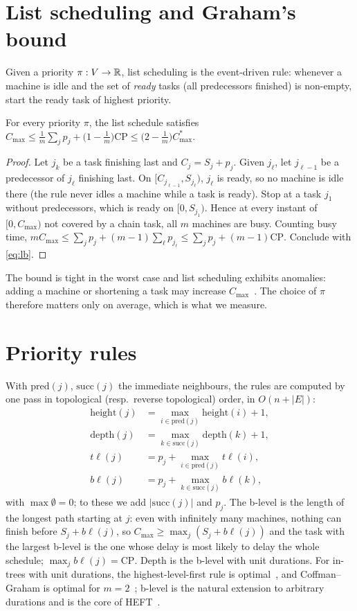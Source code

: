 \documentclass[10pt,twocolumn]{article}
\begin{document}
\section{List scheduling and Graham's bound}
Given a priority $\pi:V\to\mathbb{R}$, list scheduling is the event-driven rule: whenever a machine is idle and the set of \emph{ready} tasks (all predecessors finished) is non-empty, start the ready task of highest priority.
\begin{theorem}
For every priority $\pi$, the list schedule satisfies
$C_{\max}\le\frac1m\sum_jp_j+\big(1-\frac1m\big)\mathrm{CP}\le\big(2-\frac1m\big)C^*_{\max}.$
\end{theorem}
\begin{proof}
Let $j_k$ be a task finishing last and $C_j=S_j+p_j$. Given $j_\ell$, let $j_{\ell-1}$ be a predecessor of $j_\ell$ finishing last. On $[C_{j_{\ell-1}},S_{j_\ell})$, $j_\ell$ is ready, so no machine is idle there (the rule never idles a machine while a task is ready). Stop at a task $j_1$ without predecessors, which is ready on $[0,S_{j_1})$. Hence at every instant of $[0,C_{\max})$ not covered by a chain task, all $m$ machines are busy. Counting busy time, $mC_{\max}\le\sum_jp_j+(m-1)\sum_\ell p_{j_\ell}\le\sum_jp_j+(m-1)\mathrm{CP}$. Conclude with \eqref{eq:lb}.
\end{proof}
The bound is tight in the worst case and list scheduling exhibits anomalies: adding a machine or shortening a task may increase $C_{\max}$~\cite{graham1969}. The choice of $\pi$ therefore matters only on average, which is what we measure.

\section{Priority rules}
With $\mathrm{pred}(j)$, $\mathrm{succ}(j)$ the immediate neighbours, the rules are computed by one pass in topological (resp.\ reverse topological) order, in $O(n+|E|)$:
\begin{align*}
\mathrm{height}(j)&=\textstyle\max_{i\in\mathrm{pred}(j)}\mathrm{height}(i)+1,\\
\mathrm{depth}(j)&=\textstyle\max_{k\in\mathrm{succ}(j)}\mathrm{depth}(k)+1,\\
t\ell(j)&=p_j+\textstyle\max_{i\in\mathrm{pred}(j)}t\ell(i),\\
b\ell(j)&=p_j+\textstyle\max_{k\in\mathrm{succ}(j)}b\ell(k),
\end{align*}
with $\max\emptyset=0$; to these we add $|\mathrm{succ}(j)|$ and $p_j$. The b-level is the length of the longest path starting at $j$: even with infinitely many machines, nothing can finish before $S_j+b\ell(j)$, so $C_{\max}\ge\max_j(S_j+b\ell(j))$ and the task with the largest b-level is the one whose delay is most likely to delay the whole schedule; $\max_jb\ell(j)=\mathrm{CP}$. Depth is the b-level with unit durations. For in-trees with unit durations, the highest-level-first rule is optimal~\cite{hu1961}, and Coffman--Graham is optimal for $m=2$~\cite{coffman1972}; b-level is the natural extension to arbitrary durations and is the core of HEFT~\cite{topcuoglu2002}.
\end{document}
